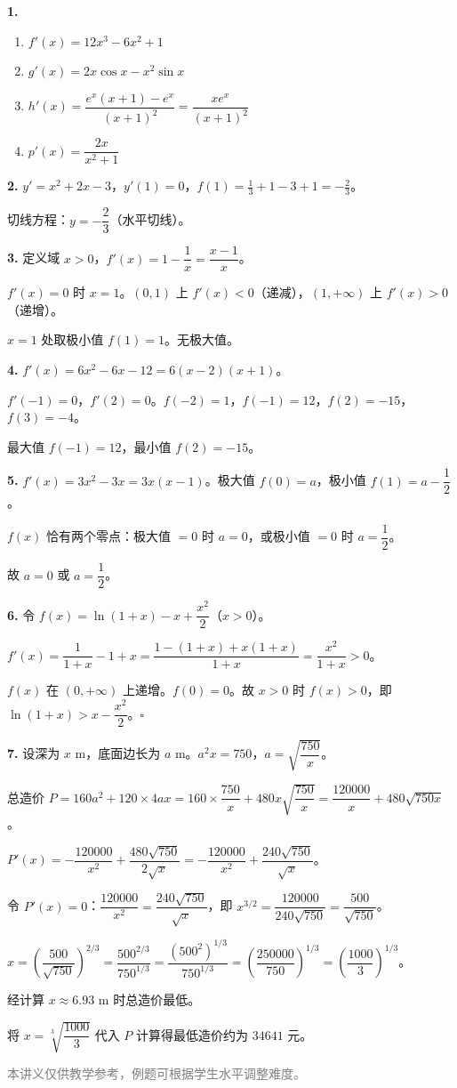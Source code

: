 \documentclass[12pt, a4paper]{ctexart}
\begin{document}
\begin{knowledgebox}[参考答案]
\textbf{1.}
\begin{enumerate}[label=(\arabic*)]
  \item $f'(x) = 12x^3 - 6x^2 + 1$
  \item $g'(x) = 2x\cos x - x^2 \sin x$
  \item $h'(x) = \dfrac{e^x(x+1) - e^x}{(x+1)^2} = \dfrac{xe^x}{(x+1)^2}$
  \item $p'(x) = \dfrac{2x}{x^2 + 1}$
\end{enumerate}

\textbf{2.} $y' = x^2 + 2x - 3$，$y'(1) = 0$，$f(1) = \frac{1}{3} + 1 - 3 + 1 = -\frac{2}{3}$。

切线方程：$y = -\dfrac{2}{3}$（水平切线）。

\textbf{3.} 定义域 $x > 0$，$f'(x) = 1 - \dfrac{1}{x} = \dfrac{x - 1}{x}$。

$f'(x) = 0$ 时 $x = 1$。$(0, 1)$ 上 $f'(x) < 0$（递减），$(1, +\infty)$ 上 $f'(x) > 0$（递增）。

$x = 1$ 处取极小值 $f(1) = 1$。无极大值。

\textbf{4.} $f'(x) = 6x^2 - 6x - 12 = 6(x-2)(x+1)$。

$f'(-1) = 0$，$f'(2) = 0$。$f(-2) = 1$，$f(-1) = 12$，$f(2) = -15$，$f(3) = -4$。

最大值 $f(-1) = 12$，最小值 $f(2) = -15$。

\textbf{5.} $f'(x) = 3x^2 - 3x = 3x(x-1)$。极大值 $f(0) = a$，极小值 $f(1) = a - \dfrac{1}{2}$。

$f(x)$ 恰有两个零点：极大值 $= 0$ 时 $a = 0$，或极小值 $= 0$ 时 $a = \dfrac{1}{2}$。

故 $a = 0$ 或 $a = \dfrac{1}{2}$。

\textbf{6.} 令 $f(x) = \ln(1+x) - x + \dfrac{x^2}{2}$（$x > 0$）。

$f'(x) = \dfrac{1}{1+x} - 1 + x = \dfrac{1 - (1+x) + x(1+x)}{1+x} = \dfrac{x^2}{1+x} > 0$。

$f(x)$ 在 $(0, +\infty)$ 上递增。$f(0) = 0$。故 $x > 0$ 时 $f(x) > 0$，即 $\ln(1+x) > x - \dfrac{x^2}{2}$。\quad $\square$

\textbf{7.} 设深为 $x$ m，底面边长为 $a$ m。$a^2 x = 750$，$a = \sqrt{\dfrac{750}{x}}$。

总造价 $P = 160a^2 + 120 \times 4ax = 160 \times \dfrac{750}{x} + 480x\sqrt{\dfrac{750}{x}} = \dfrac{120000}{x} + 480\sqrt{750x}$。

$P'(x) = -\dfrac{120000}{x^2} + \dfrac{480\sqrt{750}}{2\sqrt{x}} = -\dfrac{120000}{x^2} + \dfrac{240\sqrt{750}}{\sqrt{x}}$。

令 $P'(x) = 0$：$\dfrac{120000}{x^2} = \dfrac{240\sqrt{750}}{\sqrt{x}}$，即 $x^{3/2} = \dfrac{120000}{240\sqrt{750}} = \dfrac{500}{\sqrt{750}}$。

$x = \left(\dfrac{500}{\sqrt{750}}\right)^{2/3} = \dfrac{500^{2/3}}{750^{1/3}} = \dfrac{(500^2)^{1/3}}{750^{1/3}} = \left(\dfrac{250000}{750}\right)^{1/3} = \left(\dfrac{1000}{3}\right)^{1/3}$。

经计算 $x \approx 6.93$ m 时总造价最低。

将 $x = \sqrt[3]{\dfrac{1000}{3}}$ 代入 $P$ 计算得最低造价约为 $34641$ 元。
\end{knowledgebox}

\vfill
\begin{center}
\small\textcolor{gray}{本讲义仅供教学参考，例题可根据学生水平调整难度。}
\end{center}
\end{document}
